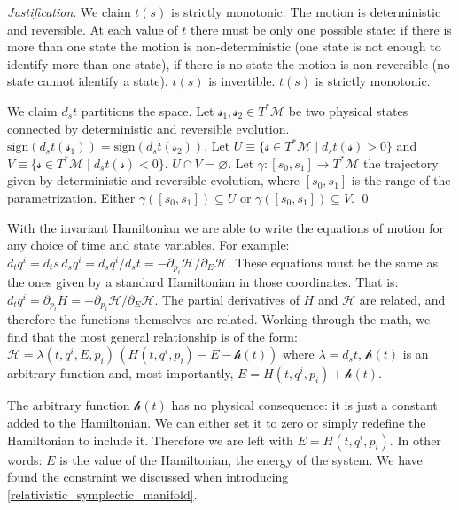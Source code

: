 \documentclass[aps,pra,10pt,twocolumn,floatfix,nofootinbib]{revtex4-1}
\numberwithin{equation}{section}
\theoremstyle{definition}
\newenvironment{justification}{\emph{Justification}.}{\qed}
\begin{document}
\begin{justification}
	We claim $t(s)$ is strictly monotonic. The motion is deterministic and reversible. At each value of $t$ there must be only one possible state: if there is more than one state the motion is non-deterministic (one state is not enough to identify more than one state), if there is no state the motion is non-reversible (no state cannot identify a state). $t(s)$ is invertible. $t(s)$ is strictly monotonic.
	
	We claim $d_{s}t$ partitions the space. Let $\mathcal{s}_1, \mathcal{s}_2 \in T^*\mathcal{M}$ be two physical states connected by deterministic and reversible evolution. $\mathrm{sign}(d_{s}t(\mathcal{s}_1)) = \mathrm{sign}(d_{s}t(\mathcal{s}_2))$. Let $U \equiv \{\mathcal{s} \in T^*\mathcal{M} \; | \; d_{s}t(\mathcal{s}) > 0 \}$ and $V \equiv \{\mathcal{s} \in T^*\mathcal{M} \; | \; d_{s}t(\mathcal{s}) < 0 \}$. $U \cap V = \varnothing$. Let $\gamma : [s_0, s_1] \rightarrow T^*\mathcal{M}$ the trajectory given by deterministic and reversible evolution, where $[s_0, s_1]$ is the range of the parametrization. Either $\gamma([s_0, s_1]) \subseteq U$ or $\gamma([s_0, s_1]) \subseteq V$.
\end{justification}

With the invariant Hamiltonian we are able to write the equations of motion for any choice of time and state variables. For example: $d_t q^i = d_t s \, d_s q^i = d_s q^i / d_s t = - \partial_{p_i} \mathcal{H} / \partial_{E} \mathcal{H}$. These equations must be the same as the ones given by a standard Hamiltonian in those coordinates. That is: $d_t q^i = \partial_{p_i} H = - \partial_{p_i} \mathcal{H} / \partial_{E} \mathcal{H}$. The partial derivatives of $H$ and $\mathcal{H}$ are related, and therefore the functions themselves are related. Working through the math, we find that the most general relationship is of the form: $\mathcal{H} = \lambda(t,q^i,E,p_i) \, (H(t,q^i,p_i) - E - \mathcal{h}(t))$ where $\lambda = d_s t$, $\mathcal{h}(t)$ is an arbitrary function and, most importantly, $E = H(t,q^i,p_i) + \mathcal{h}(t)$.

The arbitrary function $\mathcal{h}(t)$ has no physical consequence: it is just a constant added to the Hamiltonian. We can either set it to zero or simply redefine the Hamiltonian to include it. Therefore we are left with $E = H(t,q^i,p_i)$. In other words: $E$ is the value of the Hamiltonian, the energy of the system. We have found the constraint we discussed when introducing \ref{relativistic_symplectic_manifold}.
\end{document}
